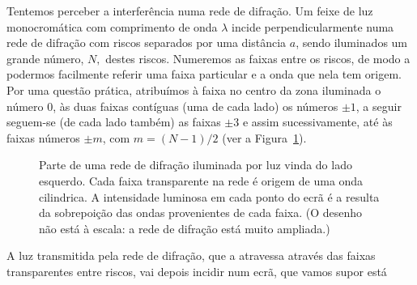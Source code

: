 Tentemos perceber a interferência numa rede de difração. Um feixe de luz
monocromática com comprimento de onda $\lambda$ incide perpendicularmente numa
rede de difração com riscos separados por uma distância $a$, sendo iluminados um
grande número, $N,$ destes riscos. Numeremos as faixas entre os riscos, de modo
a podermos facilmente referir uma faixa particular e a onda que nela tem origem.
Por uma questão prática, atribuímos à faixa no centro da zona iluminada o número
0, às duas faixas contíguas (uma de cada lado) os números $\pm1$, a seguir
seguem-se (de cada lado também) as faixas $\pm3$ e assim sucessivamente, até às
faixas números $\pm m$, com $m=(N-1)/2$ (ver a Figura~\ref{fig:grating}).
\begin{figure}[htb]
{\centering
  \par
  }
  \caption{\label{fig:grating}Parte de uma rede de difração iluminada por luz
  vinda do lado esquerdo. Cada faixa transparente na rede é origem de uma onda
  cilindrica. A intensidade luminosa em cada ponto do ecrã é a resulta da
  sobrepoição das ondas provenientes de cada faixa. (O desenho não está à
  escala: a rede de difração está muito ampliada.)}
\end{figure}
A luz transmitida pela rede de difração, que a atravessa através das faixas
transparentes entre riscos, vai depois incidir num ecrã, que vamos supor está
